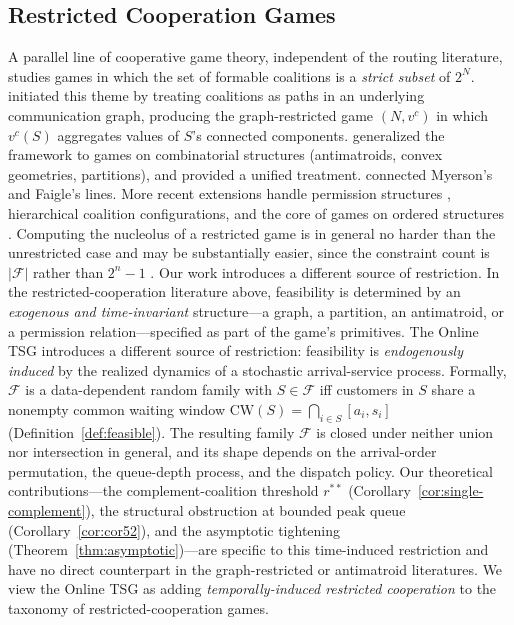 \documentclass[11pt]{article}
\theoremstyle{plain}
\theoremstyle{definition}
\theoremstyle{remark}
\newcommand{\F}{\mathcal{F}}
\newcommand{\CW}{\mathrm{CW}}
\begin{document}
\subsection{Restricted Cooperation Games}

A parallel line of cooperative game theory, independent of the routing literature, studies games in which the set of formable coalitions is a \emph{strict subset} of $2^N$. \citet{myerson1977graphs} initiated this theme by treating coalitions as paths in an underlying communication graph, producing the graph-restricted game $(N, v^{c})$ in which $v^{c}(S)$ aggregates values of $S$'s connected components. \citet{faigle1989cores} generalized the framework to games on combinatorial structures (antimatroids, convex geometries, partitions), and \citet{bilbao2000} provided a unified treatment. \citet{algaba2001unified} connected Myerson's and Faigle's lines. More recent extensions handle permission structures \citep{gilles2010economic}, hierarchical coalition configurations, and the core of games on ordered structures \citep{grabisch2013core}. Computing the nucleolus of a restricted game is in general no harder than the unrestricted case and may be substantially easier, since the constraint count is $|\F|$ rather than $2^n-1$ \citep{schouten2019nucleolus}. Our work introduces a different source of restriction. In the restricted-cooperation literature above, feasibility is determined by an \emph{exogenous and time-invariant} structure---a graph, a partition, an antimatroid, or a permission relation---specified as part of the game's primitives. The Online TSG introduces a different source of restriction: feasibility is \emph{endogenously induced} by the realized dynamics of a stochastic arrival-service process. Formally, $\F$ is a data-dependent random family with $S\in\F$ iff customers in $S$ share a nonempty common waiting window $\CW(S)=\bigcap_{i\in S}[a_i,s_i]$ (Definition~\ref{def:feasible}). The resulting family $\F$ is closed under neither union nor intersection in general, and its shape depends on the arrival-order permutation, the queue-depth process, and the dispatch policy. Our theoretical contributions---the complement-coalition threshold $r^{\ast\ast}$ (Corollary~\ref{cor:single-complement}), the structural obstruction at bounded peak queue (Corollary~\ref{cor:cor52}), and the asymptotic tightening (Theorem~\ref{thm:asymptotic})---are specific to this time-induced restriction and have no direct counterpart in the graph-restricted or antimatroid literatures. We view the Online TSG as adding \emph{temporally-induced restricted cooperation} to the taxonomy of restricted-cooperation games.
\end{document}
